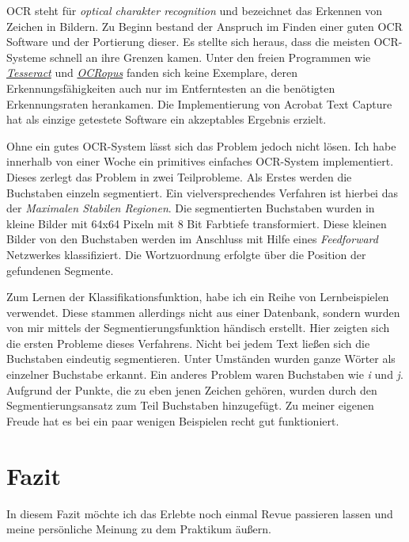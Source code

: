 \documentclass[12pt]{article}
\begin{document}
OCR steht für \textit{optical charakter recognition} und bezeichnet das Erkennen von Zeichen in Bildern.
Zu Beginn bestand der Anspruch im Finden einer guten OCR Software und der Portierung dieser.
Es stellte sich heraus, dass die meisten OCR-Systeme schnell an ihre Grenzen kamen. 
Unter den freien Programmen wie \href{http://code.google.com/p/tesseract-ocr/}{\textit{Tesseract}} und \href{http://code.google.com/p/ocropus/}{\textit{OCRopus}} fanden sich keine Exemplare, deren Erkennungsfähigkeiten
auch nur im Entferntesten an die benötigten Erkennungsraten herankamen.
Die Implementierung von Acrobat Text Capture hat als einzige getestete Software ein akzeptables Ergebnis erzielt.

Ohne ein gutes OCR-System lässt sich das Problem jedoch nicht lösen. Ich habe innerhalb von einer Woche ein primitives
einfaches OCR-System implementiert. Dieses zerlegt das Problem in zwei Teilprobleme. Als Erstes werden die Buchstaben
einzeln segmentiert. Ein vielversprechendes Verfahren ist hierbei das der \textit{Maximalen Stabilen Regionen}. 
Die segmentierten Buchstaben wurden in kleine Bilder mit 64x64 Pixeln mit 8 Bit Farbtiefe transformiert.
Diese kleinen Bilder von den Buchstaben werden im Anschluss mit Hilfe eines \textit{Feedforward} Netzwerkes klassifiziert.
Die Wortzuordnung erfolgte über die Position der gefundenen Segmente.

Zum Lernen der Klassifikationsfunktion, habe ich ein Reihe von Lernbeispielen verwendet. Diese stammen allerdings nicht
aus einer Datenbank, sondern wurden von mir mittels der Segmentierungsfunktion händisch erstellt. Hier zeigten sich
die ersten Probleme dieses Verfahrens. Nicht bei jedem Text ließen sich die Buchstaben eindeutig segmentieren. Unter
Umständen wurden ganze Wörter als einzelner Buchstabe erkannt. Ein anderes Problem waren Buchstaben wie \textit{i}
und \textit{j}. Aufgrund der Punkte, die zu eben jenen Zeichen gehören, wurden durch den Segmentierungsansatz zum Teil Buchstaben
hinzugefügt. Zu meiner eigenen Freude hat es bei ein paar wenigen Beispielen recht gut funktioniert.

\section{Fazit}

In diesem Fazit möchte ich das Erlebte noch einmal Revue passieren lassen und meine persönliche Meinung zu dem Praktikum äußern.
\end{document}
